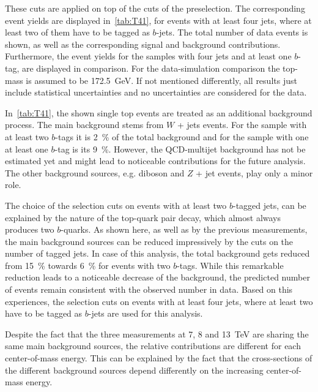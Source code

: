 These cuts are applied on top of the cuts of the preselection. The corresponding event yields are displayed in~\cref{tab:T41}, for events with at least four jets, where at least two of them have to be tagged as $b$-jets. The total number of data events is shown, as well as the corresponding signal and background contributions. Furthermore, the event yields for the samples with four jets and at least one $b$-tag, are displayed in comparison. For the data-simulation comparison the top-mass is assumed to be 172.5~GeV. If not mentioned differently, all results just include statistical uncertainties and no uncertainties are considered for the data.

\vspace{0.5cm}

\vspace{1.0cm}

In~\cref{tab:T41}, the shown single top events are treated as an additional background process.
The main background stems from $W$ + jets events. For the sample with at least two $b$-tags it is  2~\% of the total background and for the sample with one at least one $b$-tag is its 9~\%. However, the QCD-multijet background has not be estimated yet and might lead to noticeable contributions for the future analysis. The other background sources, e.g.  diboson  and $Z$ + jet events, play only a minor role. 

The choice of the selection cuts on events with at least two $b$-tagged jets, can be explained by the nature of the top-quark pair decay, which almost always produces two $b$-quarks.  As shown here, as well as by the previous measurements, the main background sources can be reduced impressively by the cuts on the number of tagged jets. In case of this analysis, the total background gets reduced from  15~\% towards 6~\% for events with two  $b$-tags. While this remarkable reduction leads to a noticeable decrease of the background, the predicted number of events remain consistent with the observed number in data. Based on this experiences, the selection cuts on events with at least four jets, where at least two have to be tagged as $b$-jets are used for this analysis.



Despite the fact that the three measurements at 7, 8 and 13~TeV are sharing the same main background sources, the relative contributions are different for each center-of-mass energy. This can be explained by the fact that the cross-sections of the different background sources depend differently  on the increasing center-of-mass energy.



